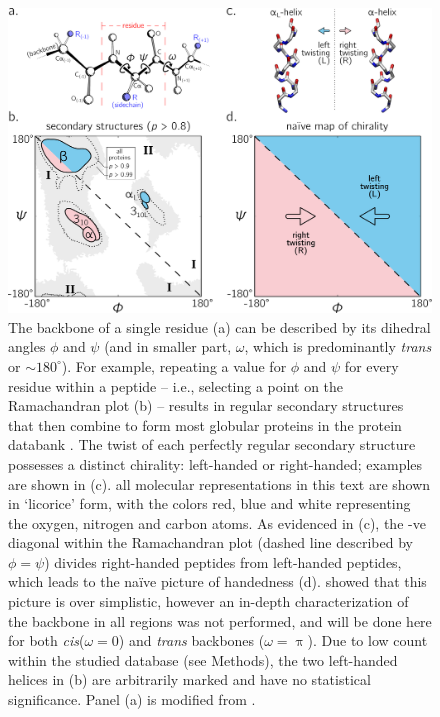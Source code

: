 \documentclass[fleqn,10pt,lineno]{wlpeerj} %
\newcommand{\n}[1]{{\color{black}#1}} %
\newcommand{\cis}{{\em cis}\xspace}
\newcommand{\trans}{{\em trans}\xspace}
\begin{document}
\begin{figure}[t!]
\centering
\includegraphics[width=0.8\linewidth]{./figures/chirality_intro.pdf}
\caption{\label{fig:intro} 
\n{The backbone of a single residue (a) can be described by its dihedral angles $\phi$ and $\psi$} (and in smaller part, $\omega$, which is predominantly \trans or $\sim 180^\circ$). For example, repeating a value for $\phi$ and $\psi$ for every residue within a peptide -- i.e., selecting a point on the Ramachandran plot (b) -- results in regular secondary structures that then combine to form most globular proteins in the protein databank \citep{Berman2000}. The twist of each perfectly regular secondary structure possesses a distinct chirality: left-handed or right-handed; examples are shown in (c). \n{all molecular representations in this text are shown in `licorice' form, with the colors red, blue and white representing the oxygen, nitrogen and carbon atoms.} As evidenced in (c), the -ve diagonal within the Ramachandran plot (dashed line described by $\phi=\psi$) divides right-handed peptides from left-handed peptides, which leads to the na{\"i}ve picture of handedness (d). \cite{Zacharias2013} showed that this picture is over simplistic, however an in-depth characterization of the backbone in all regions was not performed, and will be done here for both \cis ($\omega=0$) and \trans backbones ($\omega=\uppi$). Due to low count within the studied database (see Methods), the two left-handed helices in (b) are arbitrarily marked and have no statistical significance. \n{Panel (a) is modified from \cite{Mannige2016}.}
}
\end{figure}
\end{document}
